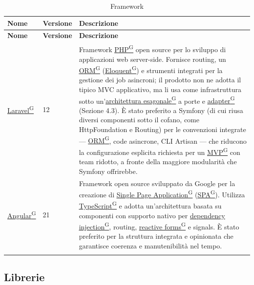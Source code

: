 \documentclass[a4paper,12pt]{article}
\providecommand{\glslink}[2]{\href{https://alittlebyte-19.github.io/Documentazione/glossario.html\#gls-#1}{\underline{#2}\textsuperscript{\scriptsize G}}}
\begin{document}
\renewcommand{\arraystretch}{1.3}
{\small
\setlength{\LTleft}{0pt}
\setlength{\LTright}{0pt}
\begin{longtable}{|p{3cm}|p{1.8cm}|p{9.7cm}|}
    \hline
    \rowcolor{gray!20}
    \textbf{Nome} & \textbf{Versione} & \textbf{Descrizione} \\
    \hline
    \endfirsthead
    \hline
    \rowcolor{gray!20}
    \textbf{Nome} & \textbf{Versione} & \textbf{Descrizione} \\
    \hline
    \endhead
    \glslink{laravel}{Laravel} & 12 & Framework \glslink{php}{PHP} open source per lo sviluppo di applicazioni web server-side. Fornisce routing, un \glslink{orm-object-relational-mapping}{ORM} (\glslink{eloquent}{Eloquent}) e strumenti integrati per la gestione dei job asincroni; il prodotto non ne adotta il tipico MVC applicativo, ma li usa come infrastruttura sotto un'\glslink{architettura-esagonale}{architettura esagonale} a porte e \glslink{adapter}{adapter} (Sezione 4.3). È stato preferito a Symfony (di cui riusa diversi componenti sotto il cofano, come HttpFoundation e Routing) per le convenzioni integrate — \glslink{orm-object-relational-mapping}{ORM}, code asincrone, CLI Artisan — che riducono la configurazione esplicita richiesta per un \glslink{mvp-minimum-viable-product}{MVP} con team ridotto, a fronte della maggiore modularità che Symfony offrirebbe. \\
    \hline
    \glslink{angular}{Angular} & 21 & Framework open source sviluppato da Google per la creazione di \glslink{spa-single-page-application}{Single Page Application} (\glslink{spa-single-page-application}{SPA}). Utilizza \glslink{typescript}{TypeScript} e adotta un'architettura basata su componenti con supporto nativo per \glslink{dependency-injection}{dependency injection}, routing, \glslink{reactive-forms}{reactive forms} e signals. È stato preferito per la struttura integrata e opinionata che garantisce coerenza e manutenibilità nel tempo. \\
    \hline
    \caption{Framework}
\end{longtable}
}

\subsection{Librerie}
\end{document}
